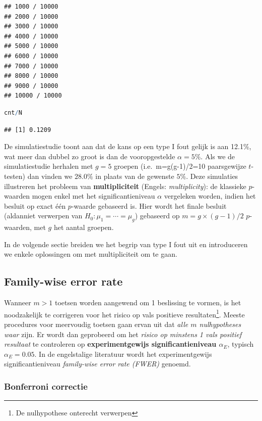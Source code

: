 \documentclass[
  12pt,dutch,coursenotes]{book}
\theoremstyle{definition}
\theoremstyle{definition}
\theoremstyle{definition}
\theoremstyle{definition}
\theoremstyle{remark}
\begin{document}
\begin{lstlisting}
## 1000 / 10000 
## 2000 / 10000 
## 3000 / 10000 
## 4000 / 10000 
## 5000 / 10000 
## 6000 / 10000 
## 7000 / 10000 
## 8000 / 10000 
## 9000 / 10000 
## 10000 / 10000
\end{lstlisting}

\begin{lstlisting}[language=R]
cnt/N
\end{lstlisting}

\begin{lstlisting}
## [1] 0.1209
\end{lstlisting}

De simulatiestudie toont aan dat de kans op een type I fout gelijk is aan 12.1\%, wat meer dan dubbel zo groot is dan de vooropgestelde \(\alpha=5\%\).
Als we de simulatiestudie herhalen met \(g=5\) groepen (i.e.~m=g(g-1)/2=10 paarsgewijze \(t\)-testen) dan vinden we \(28.0\%\) in plaats van de gewenste \(5\%\).
Deze simulaties illustreren het probleem van \textbf{multipliciteit} (Engels: \emph{multiplicity}): de klassieke \(p\)-waarden mogen enkel met het significantieniveau \(\alpha\) vergeleken worden, indien het besluit op exact één \(p\)-waarde gebaseerd is. Hier wordt het finale besluit (aldanniet verwerpen van \(H_0: \mu_1=\cdots =\mu_g\)) gebaseerd op \(m=g\times(g-1)/2\) \(p\)-waarden, met \(g\) het aantal groepen.

In de volgende sectie breiden we het begrip van type I fout uit en introduceren we enkele oplossingen om met multipliciteit om te gaan.

\hypertarget{family-wise-error-rate}{%
\subsection{Family-wise error rate}\label{family-wise-error-rate}}

Wanneer \(m>1\) toetsen worden aangewend om 1 beslissing te vormen, is het noodzakelijk te corrigeren voor het risico op vals positieve resultaten\footnote{De nulhypothese onterecht verwerpen}.
Meeste procedures voor meervoudig toetsen gaan ervan uit dat \emph{alle \(m\) nulhypotheses waar} zijn.
Er wordt dan geprobeerd om het \emph{risico op minstens 1 vals positief resultaat} te controleren op \textbf{experimentgewijs significantieniveau \(\alpha_E\)}, typisch \(\alpha_E=0.05\). In de engelstalige literatuur wordt het experimentgewijs significantieniveau \emph{family-wise error rate (FWER)} genoemd.

\hypertarget{bonferroni-correctie}{%
\subsubsection{Bonferroni correctie}\label{bonferroni-correctie}}
\end{document}
